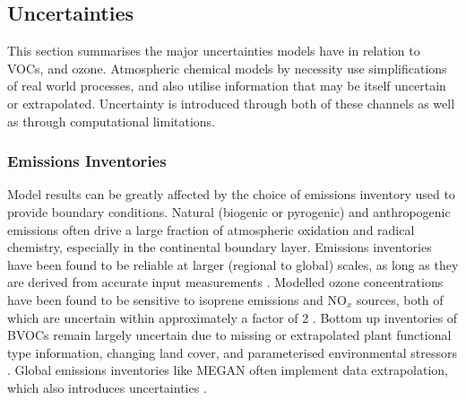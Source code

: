     
    
    
  \subsection{Uncertainties}
  \label{LR:Models:Uncert}
    
    This section summarises the major uncertainties models have in relation to  VOCs, and ozone.
    Atmospheric chemical models by necessity use simplifications of real world processes, and also utilise information that may be itself uncertain or extrapolated.
    Uncertainty is introduced through both of these channels as well as through computational limitations.
    
    
    
    \subsubsection{Emissions Inventories}
      Model results can be greatly affected by the choice of emissions inventory used to provide boundary conditions.
      Natural (biogenic or pyrogenic) and anthropogenic emissions often drive a large fraction of atmospheric oxidation and radical chemistry, especially in the continental boundary layer.
      Emissions inventories have been found to be reliable at larger (regional to global) scales, as long as they are derived from accurate input measurements \parencite{Zeng2015}.
      Modelled ozone concentrations have been found to be sensitive to isoprene emissions and NO$_x$ sources, both of which are uncertain within approximately a factor of 2 \parencite{Christian2017}.
      Bottom up inventories of BVOCs  remain largely uncertain due to missing or extrapolated plant functional type information, changing land cover, and parameterised environmental stressors \parencite{Guenther2000, Kanakidou2005, Millet2006}.
      Global emissions inventories like MEGAN often implement data extrapolation, which also introduces uncertainties \parencite{Miller2014}.
      
